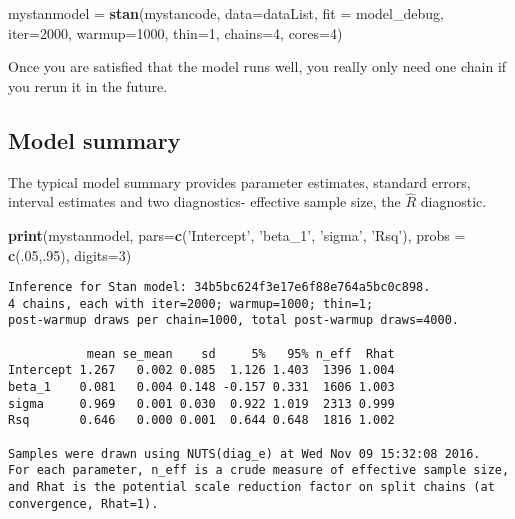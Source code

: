 \documentclass[]{book}
\newenvironment{Shaded}{\begin{snugshade}}{\end{snugshade}}
\newcommand{\KeywordTok}[1]{\textcolor[rgb]{0.13,0.29,0.53}{\textbf{{#1}}}}
\newcommand{\DataTypeTok}[1]{\textcolor[rgb]{0.13,0.29,0.53}{{#1}}}
\newcommand{\DecValTok}[1]{\textcolor[rgb]{0.00,0.00,0.81}{{#1}}}
\newcommand{\StringTok}[1]{\textcolor[rgb]{0.31,0.60,0.02}{{#1}}}
\newcommand{\NormalTok}[1]{{#1}}
\begin{document}
\begin{Shaded}
\begin{Highlighting}[]
\NormalTok{mystanmodel =}\StringTok{ }\KeywordTok{stan}\NormalTok{(mystancode, }\DataTypeTok{data=}\NormalTok{dataList, }\DataTypeTok{fit =} \NormalTok{model_debug, }
                   \DataTypeTok{iter=}\DecValTok{2000}\NormalTok{, }\DataTypeTok{warmup=}\DecValTok{1000}\NormalTok{, }\DataTypeTok{thin=}\DecValTok{1}\NormalTok{, }\DataTypeTok{chains=}\DecValTok{4}\NormalTok{, }\DataTypeTok{cores=}\DecValTok{4}\NormalTok{)}
\end{Highlighting}
\end{Shaded}

Once you are satisfied that the model runs well, you really only need
one chain if you rerun it in the future.

\subsection{Model summary}\label{model-summary}

The typical model summary provides parameter estimates, standard errors,
interval estimates and two diagnostics- effective sample size, the
\(\hat{R}\) diagnostic.

\begin{Shaded}
\begin{Highlighting}[]
\KeywordTok{print}\NormalTok{(mystanmodel, }\DataTypeTok{pars=}\KeywordTok{c}\NormalTok{(}\StringTok{'Intercept'}\NormalTok{, }\StringTok{'beta_1'}\NormalTok{, }\StringTok{'sigma'}\NormalTok{, }\StringTok{'Rsq'}\NormalTok{), }\DataTypeTok{probs =} \KeywordTok{c}\NormalTok{(.}\DecValTok{05}\NormalTok{,.}\DecValTok{95}\NormalTok{), }\DataTypeTok{digits=}\DecValTok{3}\NormalTok{)}
\end{Highlighting}
\end{Shaded}

\begin{verbatim}
Inference for Stan model: 34b5bc624f3e17e6f88e764a5bc0c898.
4 chains, each with iter=2000; warmup=1000; thin=1; 
post-warmup draws per chain=1000, total post-warmup draws=4000.

           mean se_mean    sd     5%   95% n_eff  Rhat
Intercept 1.267   0.002 0.085  1.126 1.403  1396 1.004
beta_1    0.081   0.004 0.148 -0.157 0.331  1606 1.003
sigma     0.969   0.001 0.030  0.922 1.019  2313 0.999
Rsq       0.646   0.000 0.001  0.644 0.648  1816 1.002

Samples were drawn using NUTS(diag_e) at Wed Nov 09 15:32:08 2016.
For each parameter, n_eff is a crude measure of effective sample size,
and Rhat is the potential scale reduction factor on split chains (at 
convergence, Rhat=1).
\end{verbatim}
\end{document}
